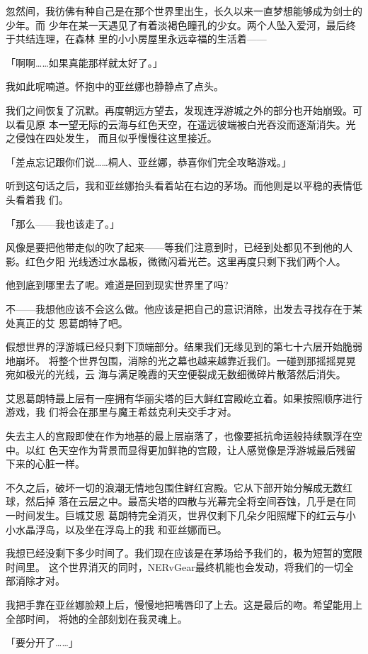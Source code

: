 \documentclass[11pt]{book}
\begin{document}
忽然间，我彷佛有种自己是在那个世界里出生，长久以来一直梦想能够成为剑士的少年。而
少年在某一天遇见了有着淡褐色瞳孔的少女。两个人坠入爱河，最后终于共结连理，在森林
里的小小房屋里永远幸福的生活着——

「啊啊……如果真能那样就太好了。」

我如此呢喃道。怀抱中的亚丝娜也静静点了点头。

我们之间恢复了沉默。再度朝远方望去，发现连浮游城之外的部分也开始崩毁。可以看见原
本一望无际的云海与红色天空，在遥远彼端被白光吞没而逐渐消失。光之侵蚀在四处发生，
而且似乎慢慢往这里接近。

「差点忘记跟你们说……桐人、亚丝娜，恭喜你们完全攻略游戏。」

听到这句话之后，我和亚丝娜抬头看着站在右边的茅场。而他则是以平稳的表情低头看着我
们。

「那么——我也该走了。」

风像是要把他带走似的吹了起来——等我们注意到时，已经到处都见不到他的人影。红色夕阳
光线透过水晶板，微微闪着光芒。这里再度只剩下我们两个人。

他到底到哪里去了呢。难道是回到现实世界里了吗?

不——我想他应该不会这么做。他应该是把自己的意识消除，出发去寻找存在于某处真正的艾
恩葛朗特了吧。

假想世界的浮游城已经只剩下顶端部分。结果我们无缘见到的第七十六层开始脆弱地崩坏。
将整个世界包围，消除的光之幕也越来越靠近我们。一碰到那摇摇晃晃宛如极光的光线，云
海与满足晚霞的天空便裂成无数细微碎片散落然后消失。

艾恩葛朗特最上层有一座拥有华丽尖塔的巨大鲜红宫殿屹立着。如果按照顺序进行游戏，我
们将会在那里与魔王希兹克利夫交手才对。

失去主人的宫殿即使在作为地基的最上层崩落了，也像要抵抗命运般持续飘浮在空中。以红
色天空作为背景而显得更加鲜艳的宫殿，让人感觉像是浮游城最后残留下来的心脏一样。

不久之后，破坏一切的浪潮无情地包围住鲜红宫殿。它从下部开始分解成无数红球，然后掉
落在云层之中。最高尖塔的四散与光幕完全将空间吞蚀，几乎是在同一时间发生。巨城艾恩
葛朗特完全消灭，世界仅剩下几朵夕阳照耀下的红云与小小水晶浮岛，以及坐在浮岛上的我
和亚丝娜而已。

我想已经没剩下多少时间了。我们现在应该是在茅场给予我们的，极为短暂的宽限时间里。
这个世界消灭的同时，NERvGear最终机能也会发动，将我们的一切全部消除才对。

我把手靠在亚丝娜脸颊上后，慢慢地把嘴唇印了上去。这是最后的吻。希望能用上全部时间，
将她的全部刻划在我灵魂上。

「要分开了……」
\end{document}
